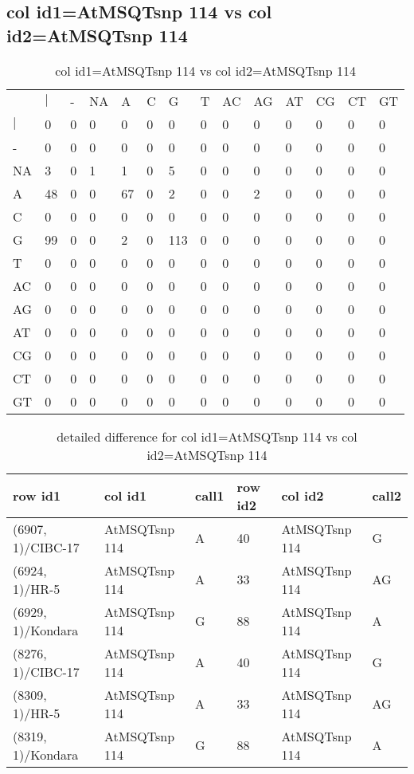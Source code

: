 \subsection{col id1=AtMSQTsnp 114 vs col id2=AtMSQTsnp 114}
\begin{center}
\begin{longtable}{|l|l|l|l|l|l|l|l|l|l|l|l|l|l|}
\caption{col id1=AtMSQTsnp 114 vs col id2=AtMSQTsnp 114} \label{table_dm700}\\
\hline
\\
\hline
&$|$&-&NA&A&C&G&T&AC&AG&AT&CG&CT&GT\\
$|$&0&0&0&0&0&0&0&0&0&0&0&0&0\\
-&0&0&0&0&0&0&0&0&0&0&0&0&0\\
NA&3&0&1&1&0&5&0&0&0&0&0&0&0\\
A&48&0&0&67&0&2&0&0&2&0&0&0&0\\
C&0&0&0&0&0&0&0&0&0&0&0&0&0\\
G&99&0&0&2&0&113&0&0&0&0&0&0&0\\
T&0&0&0&0&0&0&0&0&0&0&0&0&0\\
AC&0&0&0&0&0&0&0&0&0&0&0&0&0\\
AG&0&0&0&0&0&0&0&0&0&0&0&0&0\\
AT&0&0&0&0&0&0&0&0&0&0&0&0&0\\
CG&0&0&0&0&0&0&0&0&0&0&0&0&0\\
CT&0&0&0&0&0&0&0&0&0&0&0&0&0\\
GT&0&0&0&0&0&0&0&0&0&0&0&0&0\\
\hline
\end{longtable}
\end{center}

\begin{center}
\begin{longtable}{|l|l|l|l|l|l|}
\caption{detailed difference for col id1=AtMSQTsnp 114 vs col id2=AtMSQTsnp 114} \label{table_dm701}\\
\hline
row id1&col id1&call1&row id2&col id2&call2\\
\hline
(6907, 1)/CIBC-17&AtMSQTsnp 114&A&40&AtMSQTsnp 114&G\\
(6924, 1)/HR-5&AtMSQTsnp 114&A&33&AtMSQTsnp 114&AG\\
(6929, 1)/Kondara&AtMSQTsnp 114&G&88&AtMSQTsnp 114&A\\
(8276, 1)/CIBC-17&AtMSQTsnp 114&A&40&AtMSQTsnp 114&G\\
(8309, 1)/HR-5&AtMSQTsnp 114&A&33&AtMSQTsnp 114&AG\\
(8319, 1)/Kondara&AtMSQTsnp 114&G&88&AtMSQTsnp 114&A\\
\hline
\end{longtable}
\end{center}

